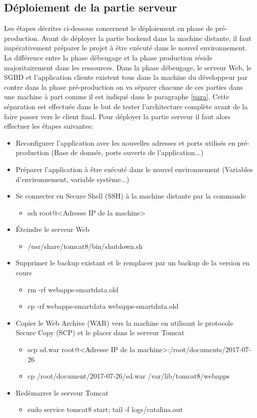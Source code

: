 \subsection{Déploiement de la partie serveur}
\qquad Les étapes décrites ci-dessous concernent le déploiement en phase de pré-production. Avant de déployer la partie backend dans la machine distante, il faut impérativement préparer le projet à être exécuté dans le nouvel environnement. La différence entre la phase débeugage et la phase production réside majoritairement dans les ressources. Dans la phase débeugage, le serveur Web, le SGBD et l'application cliente existent tous dans la machine du développeur par contre dans la phase pré-production on va séparer chacune de ces parties dans une machine à part comme il est indiqué dans le paragraphe \ref{para}. Cette séparation est effectuée dans le but de tester l'architecture complète avant de la faire passer vers le client final. Pour déployer la partie serveur il faut alors effectuer les étapes suivantes:
\begin{itemize}
	\item Reconfigurer l'application avec les nouvelles adresses et ports utilisés en pré-production (Base de donnée, ports ouverts de l'application...)
	\item Préparer l'application à être exécuté dans le nouvel environnement (Variables d'environnement, variable système...)
	\item Se connecter en Secure Shell (SSH) à la machine distante par la commande
	\begin{itemize}
		\item ssh root@<Adresse IP de la machine>
	\end{itemize}
	\item Éteindre le serveur Web
	\begin{itemize}
		\item /usr/share/tomcat8/bin/shutdown.sh
	\end{itemize}
	\item Supprimer le backup existant et le remplacer par un backup de la version en cours
	\begin{itemize}
		\item rm -rf webapps-smartdata.old
		\item cp -rf webapps-smartdata webapps-smartdata.old
	\end{itemize}
	\item Copier le Web Archive (WAR) vers la machine en utilisant le protocole Secure Copy (SCP) et le placer dans le serveur Tomcat
	\begin{itemize}
		\item scp sd.war root@<Adresse IP de la machine>:/root/documents/2017-07-26
		\item cp /root/document/2017-07-26/sd.war /var/lib/tomcat8/webapps
	\end{itemize}
	\item Redémarrer le serveur Tomcat
	\begin{itemize}
		\item sudo service tomcat8 start; tail -f logs/catalina.out
	\end{itemize}   
\end{itemize} 

